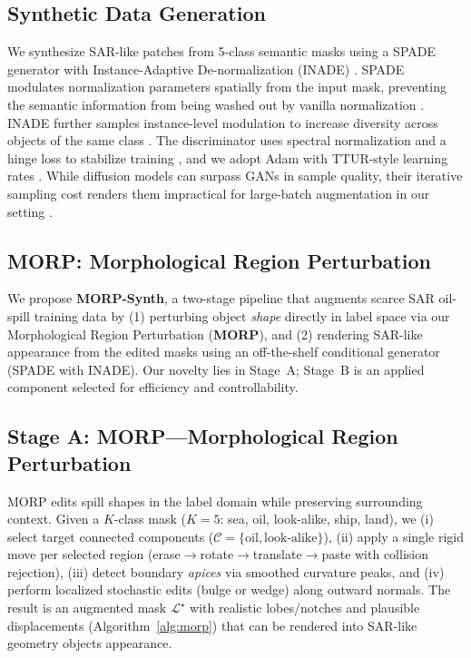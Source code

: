 \documentclass[12pt]{article}
\begin{document}
\subsection{Synthetic Data Generation}
We synthesize SAR-like patches from 5-class semantic masks using a SPADE generator with
Instance-Adaptive De-normalization (INADE) \cite{park2019spade, tan2021inade}. SPADE modulates
normalization parameters spatially from the input mask, preventing the semantic information from
being washed out by vanilla normalization \cite{park2019spade}. INADE further samples instance-level
modulation to increase diversity across objects of the same class \cite{tan2021inade}.
The discriminator uses spectral normalization and a hinge loss to stabilize training \cite{miyato2018spectral},
and we adopt Adam with TTUR-style learning rates \cite{heusel2017ttur}.
While diffusion models can surpass GANs in sample quality, their iterative sampling cost renders them
impractical for large-batch augmentation in our setting \cite{dhariwal2021diffusion, yang2022diffsurvey}.

\subsection{MORP: Morphological Region Perturbation}
\label{sec:morp}

We propose \textbf{MORP-Synth}, a two-stage pipeline that augments scarce SAR oil-spill training data by
(1) perturbing object \emph{shape} directly in label space via our Morphological Region Perturbation (\textbf{MORP}), and
(2) rendering SAR-like appearance from the edited masks using an off-the-shelf conditional generator (SPADE with INADE).
Our novelty lies in Stage~A; Stage~B is an applied component selected for efficiency and controllability.


\subsection{Stage A: MORP—Morphological Region Perturbation}
\label{sec:morp-main}
MORP edits spill shapes in the label domain while preserving surrounding context. Given a $K$-class mask
($K{=}5$: sea, oil, look-alike, ship, land), we (i) select target connected components ($\mathcal{C}{=}\{\text{oil},\text{look-alike}\}$),
(ii) apply a single rigid move per selected region (erase$\to$rotate$\to$translate$\to$paste with collision rejection),
(iii) detect boundary \emph{apices} via smoothed curvature peaks, and (iv) perform localized stochastic edits
(bulge or wedge) along outward normals. The result is an augmented mask $\mathcal{L}^\star$ with realistic
lobes/notches and plausible displacements (Algorithm~\ref{alg:morp}) that can be rendered into SAR-like geometry objects appearance.
\end{document}
